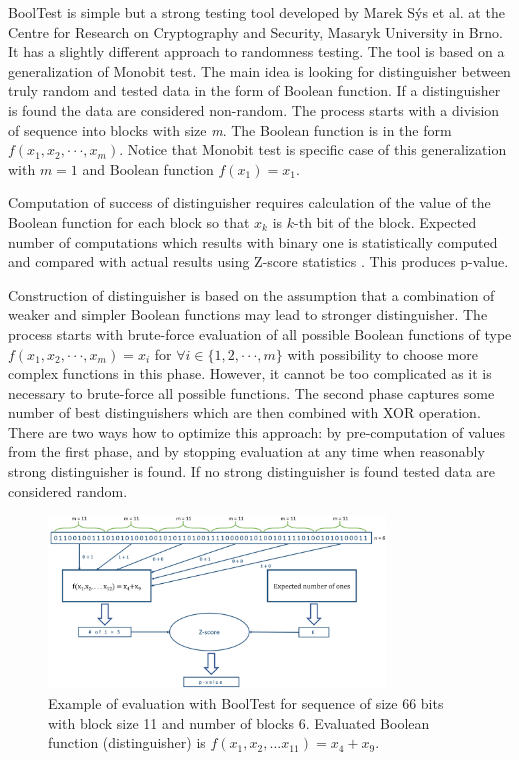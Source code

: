 \documentclass[
    digital,    %
    oneside,    %
    color,
    11pt,
    nocover,
    notable,
    nolof,
    nolot,
    final
]{fithesis3}
\renewcommand\_{\textunderscore\allowbreak}
\begin{document}
BoolTest is simple but a strong testing tool developed by Marek Sýs et al. at the Centre for Research on Cryptography and Security, Masaryk University in Brno. It has a slightly different approach to randomness testing. The tool is based on a generalization of Monobit test. The main idea is looking for distinguisher between truly random and tested data in the form of Boolean function. If a distinguisher is found the data are considered non-random. The process starts with a division of sequence into blocks with size \textit{m}. The Boolean function is in the form $f(x_{1}, x_{2}, \cdot \cdot \cdot, x_{m})$. Notice that Monobit test is specific case of this generalization with $m = 1$ and Boolean function $f(x_{1}) = x_{1}$. 

Computation of success of distinguisher requires calculation of the value of the Boolean function for each block so that $x_{k}$ is $k$-th bit of the block.
Expected number of computations which results with binary one is statistically computed and compared with actual results using Z-score statistics \cite{sheskin2003handbook}. This produces p-value.

Construction of distinguisher is based on the assumption that a combination of weaker and simpler Boolean functions may lead to stronger distinguisher. The process starts with brute-force evaluation of all possible Boolean functions of type  $f(x_{1}, x_{2}, \cdot \cdot \cdot, x_{m}) = x_{i}$ for $\forall i \in \{1, 2, \cdot \cdot \cdot, m\}$ with possibility to choose more complex functions in this phase. However, it cannot be too complicated as it is necessary to brute-force all possible functions. The second phase captures some number of best distinguishers which are then combined with XOR operation. There are two ways how to optimize this approach: by pre-computation of values from the first phase, and by stopping evaluation at any time when reasonably strong distinguisher is found. If no strong distinguisher is found tested data are considered random. \cite{booltest-secrypt2017}

\begin{figure}[h]
	\centering
	\includegraphics[width=0.8\textwidth]{./images/pictures/bool-test.png}
	\caption{Example of evaluation with BoolTest for sequence of size 66 bits with block size 11 and number of blocks 6. Evaluated Boolean function (distinguisher) is $f(x_1,x_2, . . . x_{11}) = x_4+x_9$.}
	\label{fig:bool-test}
\end{figure}
\end{document}
